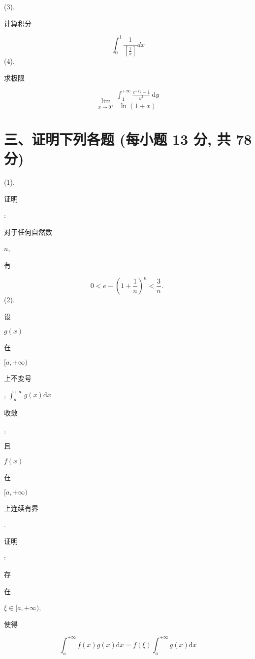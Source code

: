 \documentclass[10pt]{article}
\begin{document}
(3). \begin{CJK}{UTF8}{mj}计算积分\end{CJK}
$$
\int_{0}^{1} \frac{1}{\left[\frac{1}{x}\right]} d x
$$
(4). \begin{CJK}{UTF8}{mj}求极限\end{CJK}
$$
\lim _{x \rightarrow 0^{+}} \frac{\int_{1}^{+\infty} \frac{e^{-x y}-1}{y^{3}} \mathrm{~d} y}{\ln (1+x)}
$$

\section{三、证明下列各题 (每小题 13 分, 共 78 分)}
(1). \begin{CJK}{UTF8}{mj}证明\end{CJK}: \begin{CJK}{UTF8}{mj}对于任何自然数\end{CJK} $n$, \begin{CJK}{UTF8}{mj}有\end{CJK}
$$
0<e-\left(1+\frac{1}{n}\right)^{n}<\frac{3}{n} \text {. }
$$
(2). \begin{CJK}{UTF8}{mj}设\end{CJK} $g(x)$ \begin{CJK}{UTF8}{mj}在\end{CJK} $[a,+\infty)$ \begin{CJK}{UTF8}{mj}上不变号\end{CJK}, $\int_{a}^{+\infty} g(x) \mathrm{d} x$ \begin{CJK}{UTF8}{mj}收敛\end{CJK}, \begin{CJK}{UTF8}{mj}且\end{CJK} $f(x)$ \begin{CJK}{UTF8}{mj}在\end{CJK} $[a,+\infty)$ \begin{CJK}{UTF8}{mj}上连续有界\end{CJK}. \begin{CJK}{UTF8}{mj}证明\end{CJK}: \begin{CJK}{UTF8}{mj}存\end{CJK} \begin{CJK}{UTF8}{mj}在\end{CJK} $\xi \in[a,+\infty)$, \begin{CJK}{UTF8}{mj}使得\end{CJK}
$$
\int_{a}^{+\infty} f(x) g(x) \mathrm{d} x=f(\xi) \int_{a}^{+\infty} g(x) \mathrm{d} x
$$
\end{document}
